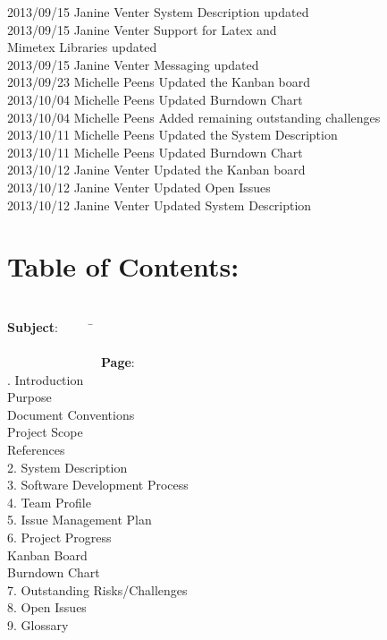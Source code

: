 \documentclass[29pt,a4paper]{moderncv}
\begin{document}
\begin{tabbing}
2013/09/15  \> Janine Venter \> System Description updated\\
2013/09/15  \> Janine Venter \> Support for Latex and \\ \> \> \> Mimetex Libraries updated\\
2013/09/15  \> Janine Venter \> Messaging updated\\
2013/09/23  \> Michelle Peens \> Updated the Kanban board\\
2013/10/04  \> Michelle Peens \> Updated Burndown Chart\\
2013/10/04  \> Michelle Peens \> Added remaining outstanding challenges\\
2013/10/11  \> Michelle Peens \> Updated the System Description\\
2013/10/11  \> Michelle Peens \> Updated Burndown Chart\\
2013/10/12  \> Janine Venter \> Updated the Kanban board\\
2013/10/12  \> Janine Venter \> Updated Open Issues\\
2013/10/12  \> Janine Venter \> Updated System Description\\


\end{tabbing}

\newpage
\section{\textbf{Table of Contents:}}
\begin{tabbing}
\\\textbf{Subject}: ~~~~~\= ~~~~~~~~~~~~~~~~~~~~~~~~~~~~~~~~~~~~~~~~~~~~~~~~~~~~~~~~~~~~~~~~~~~~~~~~~~~~~~~~~~~~~~~\= \textbf{Page}:
\\. Introduction \> \\							
 Purpose 	\\							
 Document Conventions 					\\
 Project Scope 							\\
 References 							\\
2. System Description \> 					\\
3. Software Development Process \> 				\\
4. Team Profile\>  				\\
5. Issue Management Plan \>  	\\
6. Project Progress \>  	\\
 Kanban Board \\
 Burndown Chart \\
7. Outstanding Risks/Challenges \>  	\\
8. Open Issues \>  	\\
9. Glossary \>  	\\
\end{tabbing}
\end{document}

